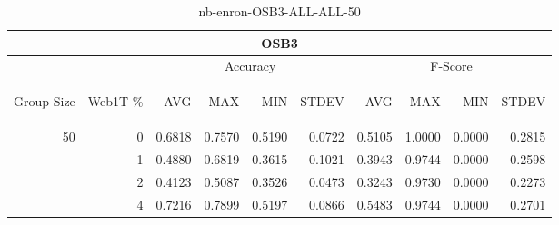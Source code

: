 \begin{center}
\begin{table}[htbp]
\begin{tabular}{ | r | r | r | r | r | r | r | r | r | r |}
\hline
\multicolumn{10}{|c|}{OSB3}\\
\hline
 & & \multicolumn{4}{|c|}{Accuracy} & \multicolumn{4}{|c|}{F-Score}\\ \cline{3-10}
\begin{sideways}Group Size\end{sideways} & \begin{sideways}Web1T \%\end{sideways} & \begin{sideways}AVG\end{sideways} & \begin{sideways}MAX\end{sideways} & \begin{sideways}MIN\end{sideways} & \begin{sideways}STDEV\end{sideways} & \begin{sideways}AVG\end{sideways} & \begin{sideways}MAX\end{sideways} & \begin{sideways}MIN\end{sideways} & \begin{sideways}STDEV\end{sideways}\\
\hline
\multirow{4}{*}{50}
 & 0 & 0.6818 & 0.7570 & 0.5190 & 0.0722 & 0.5105 & 1.0000 & 0.0000 & 0.2815\\ \cline{2-10}
 & 1 & 0.4880 & 0.6819 & 0.3615 & 0.1021 & 0.3943 & 0.9744 & 0.0000 & 0.2598\\ \cline{2-10}
 & 2 & 0.4123 & 0.5087 & 0.3526 & 0.0473 & 0.3243 & 0.9730 & 0.0000 & 0.2273\\ \cline{2-10}
 & 4 & 0.7216 & 0.7899 & 0.5197 & 0.0866 & 0.5483 & 0.9744 & 0.0000 & 0.2701\\ \cline{2-10}
\hline
\end{tabular}
\caption{nb-enron-OSB3-ALL-ALL-50}
\end{table}
\end{center}

